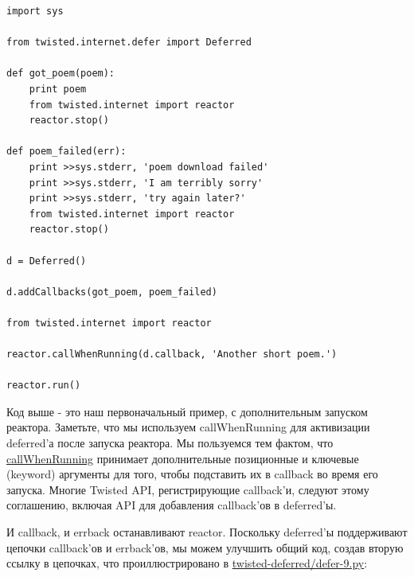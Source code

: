 \begin{scriptsize}\begin{verbatim}
import sys

from twisted.internet.defer import Deferred

def got_poem(poem):
    print poem
    from twisted.internet import reactor
    reactor.stop()

def poem_failed(err):
    print >>sys.stderr, 'poem download failed'
    print >>sys.stderr, 'I am terribly sorry'
    print >>sys.stderr, 'try again later?'
    from twisted.internet import reactor
    reactor.stop()

d = Deferred()

d.addCallbacks(got_poem, poem_failed)

from twisted.internet import reactor

reactor.callWhenRunning(d.callback, 'Another short poem.')

reactor.run()
\end{verbatim}\end{scriptsize}

Код выше - это наш первоначальный пример, с 
дополнительным запуском реактора. Заметьте, 
что мы используем callWhenRunning для активизации deferred'а 
после запуска реактора. Мы пользуемся тем фактом, что 
\href{http://twistedmatrix.com/trac/browser/tags/releases/twisted-8.2.0/twisted/internet/interfaces.py#L766}{callWhenRunning} 
принимает дополнительные позиционные и ключевые (keyword) аргументы 
для того, чтобы подставить их в callback во время его запуска. 
Многие Twisted API, регистрирующие callback'и, следуют 
этому соглашению, включая API для добавления callback'ов в deferred'ы.


И callback, и errback останавливают reactor. 
Поскольку deferred'ы поддерживают цепочки 
callback'ов и errback'ов, мы можем улучшить общий код, 
создав вторую ссылку в цепочках, что проиллюстрировано в 
\href{http://github.com/jdavisp3/twisted-intro/blob/master/twisted-deferred/defer-9.py}{twisted-deferred/defer-9.py}:

